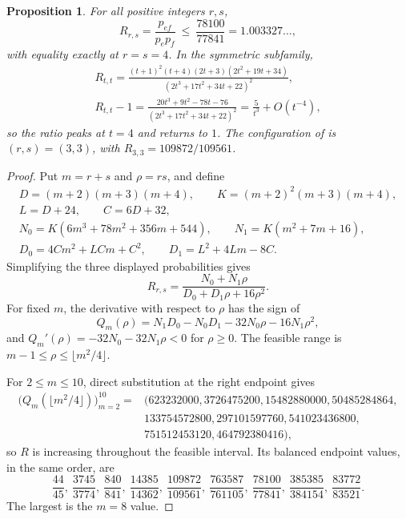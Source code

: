\documentclass[11pt,a4paper]{amsart}
\theoremstyle{plain}
\newtheorem{proposition}[theorem]{Proposition}
\theoremstyle{definition}
\theoremstyle{remark}
\begin{document}
\begin{proposition}
\label{prop:bundle}
For all positive integers $r,s$,
\[
R_{r,s}=\frac{p_{ef}}{p_ep_f}\ \le\ \frac{78100}{77841}=1.003327\ldots,
\]
with equality exactly at $r=s=4$. In the symmetric subfamily,
\begin{gather*}
R_{t,t}=\frac{(t+1)^2(t+4)(2t+3)(2t^2+19t+34)}{(2t^3+17t^2+34t+22)^2},\\[2pt]
R_{t,t}-1=\frac{20t^3+9t^2-78t-76}{(2t^3+17t^2+34t+22)^2}=\frac5{t^3}+O(t^{-4}),
\end{gather*}
so the ratio peaks at $t=4$ and returns to $1$. The configuration of \cite{LPS}
is $(r,s)=(3,3)$, with $R_{3,3}=109872/109561$.
\end{proposition}

\begin{proof}
Put $m=r+s$ and $\rho=rs$, and define
\begin{gather*}
D=(m+2)(m+3)(m+4),\qquad
K=(m+2)^2(m+3)(m+4),\\
L=D+24,\qquad C=6D+32,\\
N_0=K(6m^3+78m^2+356m+544),\qquad
N_1=K(m^2+7m+16),\\
D_0=4Cm^2+LCm+C^2,\qquad
D_1=L^2+4Lm-8C.
\end{gather*}
Simplifying the three displayed probabilities gives
\begin{equation}
\label{eq:bundle-rho}
R_{r,s}=\frac{N_0+N_1\rho}{D_0+D_1\rho+16\rho^2}.
\end{equation}
For fixed $m$, the derivative with respect to $\rho$ has the sign of
\[
Q_m(\rho)=N_1D_0-N_0D_1-32N_0\rho-16N_1\rho^2,
\]
and $Q_m'(\rho)=-32N_0-32N_1\rho<0$ for $\rho\ge0$. The feasible range is
$m-1\le\rho\le\lfloor m^2/4\rfloor$.

For $2\le m\le10$, direct substitution at the right endpoint gives
\begin{align*}
\bigl(Q_m(\lfloor m^2/4\rfloor)\bigr)_{m=2}^{10}
={}&(623232000,3726475200,15482880000,50485284864,\\
&133754572800,297101597760,541023436800,\\
&751512453120,464792380416),
\end{align*}
so $R$ is increasing throughout the feasible interval. Its balanced endpoint
values, in the same order, are
\[
\frac{44}{45},\ \frac{3745}{3774},\ \frac{840}{841},\
\frac{14385}{14362},\ \frac{109872}{109561},\
\frac{763587}{761105},\ \frac{78100}{77841},\
\frac{385385}{384154},\ \frac{83772}{83521}.
\]
The largest is the $m=8$ value.


\end{proof}
\end{document}
